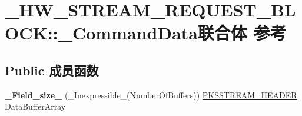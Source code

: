 \hypertarget{union___h_w___s_t_r_e_a_m___r_e_q_u_e_s_t___b_l_o_c_k_1_1___command_data}{}\section{\+\_\+\+H\+W\+\_\+\+S\+T\+R\+E\+A\+M\+\_\+\+R\+E\+Q\+U\+E\+S\+T\+\_\+\+B\+L\+O\+CK\+:\+:\+\_\+\+Command\+Data联合体 参考}
\label{union___h_w___s_t_r_e_a_m___r_e_q_u_e_s_t___b_l_o_c_k_1_1___command_data}
\subsection*{Public 成员函数}
\begin{DoxyCompactItemize}
\item 
\mbox{\label{union___h_w___s_t_r_e_a_m___r_e_q_u_e_s_t___b_l_o_c_k_1_1___command_data_a4a9433f5afe4e7156ddb167327808cb4}} 
{\bfseries \+\_\+\+Field\+\_\+size\+\_\+} (\+\_\+\+Inexpressible\+\_\+(Number\+Of\+Buffers)) \hyperlink{struct_k_s_s_t_r_e_a_m___h_e_a_d_e_r}{P\+K\+S\+S\+T\+R\+E\+A\+M\+\_\+\+H\+E\+A\+D\+ER} Data\+Buffer\+Array
\end{DoxyCompactItemize}
